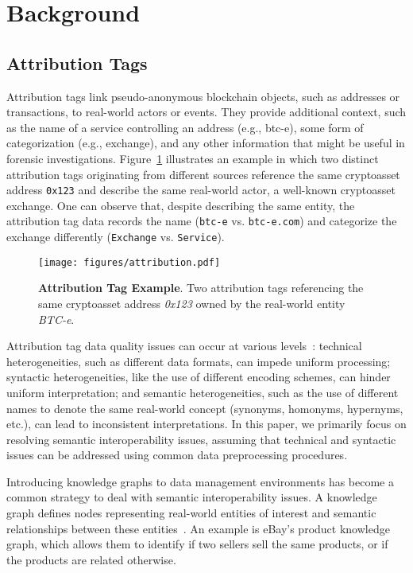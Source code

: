 
\section{Background}
\label{sec:background}

\subsection{Attribution Tags}

Attribution tags link pseudo-anonymous blockchain objects, such as addresses or transactions, to real-world actors or events. They provide additional context, such as the name of a service controlling an address (e.g., btc-e), some form of categorization (e.g., exchange), and any other information that might be useful in forensic investigations. Figure~\ref{fig:tag-example} illustrates an example in which two distinct attribution tags originating from different sources reference the same cryptoasset address \texttt{0x123} and describe the same real-world actor, a well-known cryptoasset exchange. One can observe that, despite describing the same entity, the attribution tag data records the name (\texttt{btc-e} vs. \texttt{btc-e.com}) and categorize the exchange differently (\texttt{Exchange} vs. \texttt{Service}).

\begin{figure}
    \centering
    \texttt{[image: figures/attribution.pdf]}
    \caption{\textbf{Attribution Tag Example}. Two attribution tags referencing the same cryptoasset address \emph{0x123} owned by the real-world entity \emph{BTC-e}.}
    \label{fig:tag-example}
\end{figure}

Attribution tag data quality issues can occur at various levels~\cite{Haslhofer2010}: technical heterogeneities, such as different data formats, can impede uniform processing; syntactic heterogeneities, like the use of different encoding schemes, can hinder uniform interpretation; and semantic heterogeneities, such as the use of different names to denote the same real-world concept (synonyms, homonyms, hypernyms, etc.), can lead to inconsistent interpretations. In this paper, we primarily focus on resolving semantic interoperability issues, assuming that technical and syntactic issues can be addressed using common data preprocessing procedures.

Introducing knowledge graphs to data management environments has become a common strategy to deal with semantic interoperability issues. A knowledge graph defines nodes representing real-world entities of interest and semantic relationships between these entities~\cite{Hogan2021}. An example is eBay's product knowledge graph, which allows them to identify if two sellers sell the same products, or if the products are related otherwise. 

